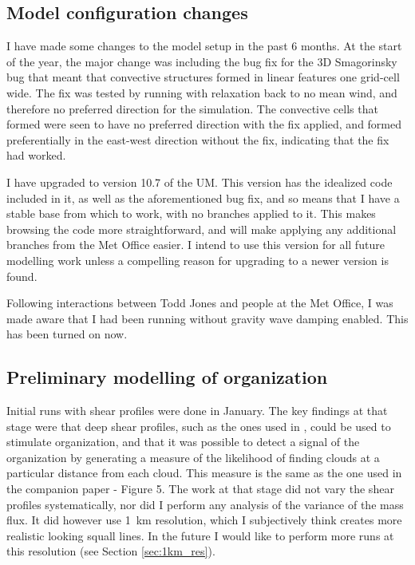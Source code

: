 \documentclass[11pt,a4paper]{article}
\newcommand\todo[1]{\textbf{TODO: #1}}
\begin{document}
\subsection{Model configuration changes}
\label{sec:modelling_config}

I have made some changes to the model setup in the past 6 months. At the start of the year, the major change was including the bug fix for the 3D Smagorinsky bug that meant that convective structures formed in linear features one grid-cell wide. The fix was tested by running with relaxation back to no mean wind, and therefore no preferred direction for the simulation. The convective cells that formed were seen to have no preferred direction with the fix applied, and formed preferentially in the east-west direction without the fix, indicating that the fix had worked.

I have upgraded to version 10.7 of the UM. This version has the idealized code included in it, as well as the aforementioned bug fix, and so means that I have a stable base from which to work, with no branches applied to it. This makes browsing the code more straightforward, and will make applying any additional branches from the Met Office easier. I intend to use this version for all future modelling work unless a compelling reason for upgrading to a newer version is found.

Following interactions between Todd Jones and people at the Met Office, I was made aware that I had been running without gravity wave damping enabled. This has been turned on now.



\subsection{Preliminary modelling of organization}
\label{sec:prelim_modelling}

Initial runs with shear profiles were done in January. The key findings at that stage were that deep shear profiles, such as the ones used in \cite{cohen2006fluctuations}, could be used to stimulate organization, and that it was possible to detect a signal of the organization by generating a measure of the likelihood of finding clouds at a particular distance from each cloud. This measure is the same as the one used in the companion paper \cite{muetz2017effects} - Figure 5. The work at that stage did not vary the shear profiles systematically, nor did I perform any analysis of the variance of the mass flux. It did however use \SI{1}{km} resolution, which I subjectively think creates more realistic looking squall lines. In the future I would like to perform more runs at this resolution (see Section \ref{sec:1km_res}).
\end{document}

